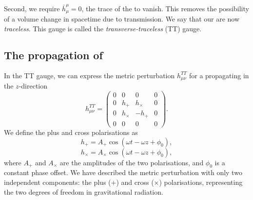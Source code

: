 Second, we require $\bar{h}^{\mu}_{\mu} = 0$, the trace of the \gw to vanish. This removes the possibility of a volume change in spacetime due to \gwadj transmission. We say that our \gws are now \textit{traceless}. This gauge is called the \textit{transverse-traceless} (TT) gauge.

\subsection{\label{1:sec:gravitational-propagation}The propagation of \gws}

In the TT gauge, we can express the metric perturbation $h^{TT}_{\mu\nu}$ for a \gw propagating in the $z$-direction
%
\begin{equation}
   h^{TT}_{\mu \nu} =
   \begin{pmatrix}
      0 & 0 & 0 & 0 \\
      0 & h_+ & h_\times & 0 \\
      0 & h_\times & -h_+ & 0 \\
      0 & 0 & 0 & 0
   \end{pmatrix}.
   \label{1:eqn:h_TT}
\end{equation}
%
We define the plus and cross polarisations as~\cite{Moore_book:2012}
%
\begin{equation}
    h_+ = A_+ \cos(\omega t - \omega z + \phi_{0}),
    \label{1:eq:h_+_cos}
\end{equation}
%
\begin{equation}
    h_{\times} = A_{\times} \cos(\omega t - \omega z + \phi_{0}),
\end{equation}
%
where $A_+$ and $A_\times$ are the amplitudes of the two polarisations, and $\phi_{0}$ is a constant phase offset. We have described the metric perturbation with only two independent components: the plus ($+$) and cross ($\times$) polarisations, representing the two degrees of freedom in gravitational radiation.

